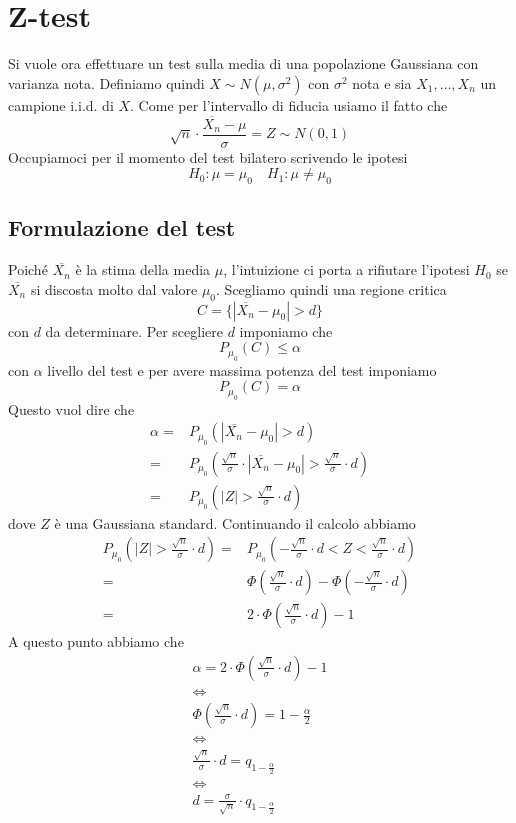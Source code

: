 \section{Z-test}
Si vuole ora effettuare un test sulla media di una popolazione Gaussiana con varianza nota.
Definiamo quindi $X \sim N(\mu, \sigma^2)$ con $\sigma^2$ nota e sia $X_1, \dots, X_n$ un campione
i.i.d. di $X$. Come per l'intervallo di fiducia usiamo il fatto che
\[ \sqrt{n} \cdot \frac{\overline{X_n} - \mu}{\sigma} = Z \sim N(0,1) \]
Occupiamoci per il momento del test bilatero scrivendo le ipotesi
\[ H_0: \mu = \mu_0 \quad H_1: \mu \neq \mu_0 \]

\subsection{Formulazione del test}
Poiché $\overline{X_n}$ è la stima della media $\mu$,
l'intuizione ci porta a rifiutare l'ipotesi $H_0$ se $\overline{X_n}$ si discosta molto dal valore
$\mu_0$. Scegliamo quindi una regione critica
\[ C = \{ | \overline{X_n} - \mu_0 | > d \} \]
con $d$ da determinare. Per scegliere $d$ imponiamo che
\[ P_{\mu_0} (C) \leq \alpha \]
con $\alpha$ livello del test e per avere massima potenza del test imponiamo
\[ P_{\mu_0} (C) = \alpha \]
Questo vuol dire che
\begin{align*}
	\alpha = & P_{\mu_0} ( | \overline{X_n} - \mu_0 | > d )                   \\
	=        & P_{\mu_0} \left( \frac{\sqrt{n}}{\sigma} \cdot
	|\overline{X_n} - \mu_0| > \frac{\sqrt{n}}{\sigma} \cdot d \right)        \\
	=        & P_{\mu_0} \left( |Z| > \frac{\sqrt{n}}{\sigma} \cdot d \right)
\end{align*}
dove $Z$ è una Gaussiana standard. Continuando il calcolo abbiamo
\begin{align*}
	P_{\mu_0} \left( |Z| > \frac{\sqrt{n}}{\sigma} \cdot d \right)
	= & P_{\mu_0} \left( -\frac{\sqrt{n}}{\sigma} \cdot d < Z
	< \frac{\sqrt{n}}{\sigma} \cdot d \right)                           \\
	= & \Phi \left( \frac{\sqrt{n}}{\sigma} \cdot d \right) -
	\Phi \left( -\frac{\sqrt{n}}{\sigma} \cdot d \right)                \\
	= & 2 \cdot \Phi \left( \frac{\sqrt{n}}{\sigma} \cdot d \right) - 1
\end{align*}
A questo punto abbiamo che
\begin{gather*}
	\alpha = 2 \cdot \Phi \left( \frac{\sqrt{n}}{\sigma} \cdot d \right) - 1 \\
	\Leftrightarrow \\
	\Phi \left( \frac{\sqrt{n}}{\sigma} \cdot d \right) = 1 - \frac{\alpha}{2} \\
	\Leftrightarrow \\
	\frac{\sqrt{n}}{\sigma} \cdot d = q_{1 - \frac{\alpha}{2}} \\
	\Leftrightarrow \\
	d = \frac{\sigma}{\sqrt{n}} \cdot q_{1 - \frac{\alpha}{2}}
\end{gather*}
